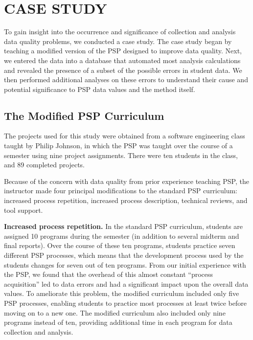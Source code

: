 

\section{CASE STUDY}

To gain insight into the occurrence and significance of collection and
analysis data quality problems, we conducted a case study. The case study
began by teaching a modified version of the PSP designed to improve data
quality.  Next, we entered the data into a database that automated most
analysis calculations and revealed the presence of a subset of the possible
errors in student data.  We then performed additional analyses on these
errors to understand their cause and potential significance to PSP data
values and the method itself.

  \subsection{The Modified PSP Curriculum}
  
  The projects used for this study were obtained from a software
  engineering class taught by Philip Johnson, in which the PSP was taught
  over the course of a semester using nine project assignments. There were
  ten students in the class, and 89 completed projects.
   
  Because of the concern with data quality from prior experience teaching
  PSP, the instructor made four principal modifications to the standard PSP
  curriculum: increased process repetition,  increased process description,
  technical reviews, and tool support.
  
  {\bf Increased process repetition.} In the standard PSP curriculum,
  students are assigned 10 programs during the semester (in addition to
  several midterm and final reports). Over the course of these ten
  programs, students practice seven different PSP processes, which means
  that the development process used by the students changes for seven out
  of ten programs.  From our initial experience with the PSP, we found
  that the overhead of this almost constant ``process acquisition'' led to
  data errors and had a significant impact upon the overall data values.
  To ameliorate this problem, the modified curriculum included only five
  PSP processes, enabling students to practice most
  processes at least twice before moving on to a new one. The modified
  curriculum also included only nine programs instead of ten, providing
  additional time in each program for data collection and analysis.
  
